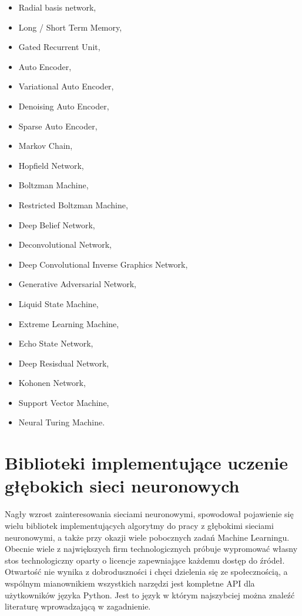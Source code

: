 \documentclass[12pt,a4paper,twoside,titlepage,openright]{book}
\begin{document}
\begin{itemize}
\item Radial basis network,
\item Long / Short Term Memory,
\item Gated Recurrent Unit,
\item Auto Encoder,
\item Variational Auto Encoder,
\item Denoising Auto Encoder,
\item Sparse Auto Encoder,
\item Markov Chain,
\item Hopfield Network,
\item Boltzman Machine,
\item Restricted Boltzman Machine,
\item Deep Belief Network,
\item Deconvolutional Network,
\item Deep Convolutional Inverse Graphics Network,
\item Generative Adversarial Network,
\item Liquid State Machine,
\item Extreme Learning Machine,
\item Echo State Network,
\item Deep Resisdual Network,
\item Kohonen Network,
\item Support Vector Machine,
\item Neural Turing Machine.
\end{itemize}

\chapter{Biblioteki implementujące uczenie głębokich sieci neuronowych}
Nagły wzrost zainteresowania sieciami neuronowymi, spowodował pojawienie się wielu bibliotek implementujących algorytmy do pracy z głębokimi sieciami neuronowymi, a także przy okazji wiele pobocznych zadań Machine Learningu. Obecnie wiele z największych firm technologicznych próbuje wypromować własny stos technologiczny oparty o licencje zapewniające każdemu dostęp do źródeł. Otwartość nie wynika z dobroduszności i chęci dzielenia się ze społecznością, a wspólnym mianownikiem wszystkich narzędzi jest kompletne API dla użytkowników języka Python. Jest to język w którym najszybciej można znaleźć literaturę wprowadzającą w zagadnienie. \cite{siteDLByLanguage}
\end{document}
